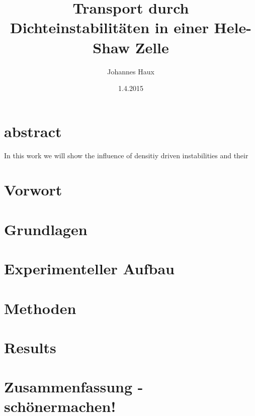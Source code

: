 \documentclass[oneside, a4paper, DIV=11,twocolumn]{book}
\title{Transport durch Dichteinstabilitäten in einer Hele-Shaw Zelle}
\author{Johannes Haux}
\date{1.4.2015}
\begin{document}

\maketitle

\onecolumn
\chapter*{abstract}
  
  In this work we will show the influence of densitiy driven instabilities and their 
\twocolumn
\tableofcontents
\listoffigures

\chapter{Vorwort}


\chapter{Grundlagen}


\chapter{Experimenteller Aufbau}


\chapter{Methoden}


\chapter{Results}


\chapter{Zusammenfassung - schönermachen!}





\end{document}
